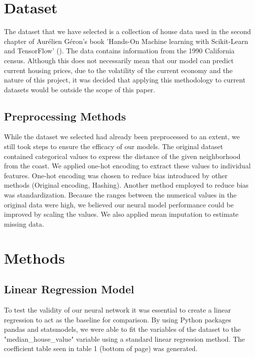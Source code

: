 \documentclass[11pt]{article}
\begin{document}
\section{Dataset}

The dataset that we have selected is a collection of house data used in the second chapter of Aurélien Géron's book 'Hands-On Machine learning with Scikit-Learn and TensorFlow' (\citeyear{Geron2022}). The data contains information from the 1990 California census. Although this does not necessarily mean that our model can predict current housing prices, due to the volatility of the current economy and the nature of this project, it was decided that applying this methodology to current datasets would be outside the scope of this paper.

\subsection{Preprocessing Methods}

While the dataset we selected had already been preprocessed to an extent, we still took steps to ensure the efficacy of our models. The original dataset contained categorical values to express the distance of the given neighborhood from the coast. 
We applied one-hot encoding to extract these values to individual features. One-hot encoding was chosen to reduce bias introduced by other methods (Original encoding, Hashing). Another method employed to reduce bias was standardization. Because the ranges between the numerical values in the original data were high, we believed our neural model performance could be improved by scaling the values. We also applied mean imputation to estimate missing data.


\section{Methods}

\subsection{Linear Regression Model}

To test the validity of our neural network it was essential to create a linear regression to act as the baseline for comparison. By using Python packages pandas and statsmodels, we were able to fit the variables of the dataset to the "median\_house\_value" variable using a standard linear regression method. The coefficient table seen in table 1 (bottom of page) was generated.
\end{document}
